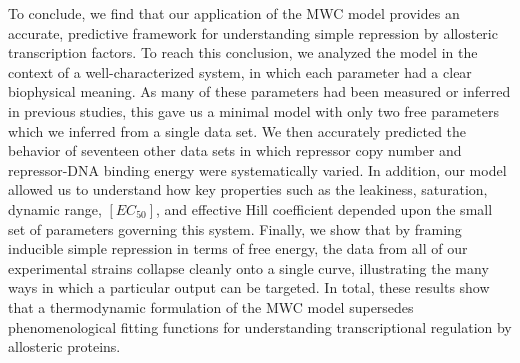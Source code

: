 To conclude, we find that our application of the MWC model provides an accurate,
predictive framework for understanding simple repression by allosteric
transcription factors. To reach this conclusion, we analyzed the model in the
context of a well-characterized system, in which each parameter had a clear
biophysical meaning. As many of these parameters had been measured or inferred
in previous studies, this gave us a minimal model with only two free parameters
which we inferred from a single data set. We then accurately predicted the
behavior of seventeen other data sets in which repressor copy number and
repressor-DNA binding energy were systematically varied. In addition, our model
allowed us to understand how key properties such as the leakiness, saturation,
dynamic range, $[EC_{50}]$, and effective Hill coefficient depended upon the
small set of parameters governing this system. Finally, we show that by framing
inducible simple repression in terms of free energy, the data from all of our
experimental strains collapse cleanly onto a single curve, illustrating the many
ways in which a particular output can be targeted. In total, these results show
that a thermodynamic formulation of the MWC model supersedes phenomenological
fitting functions for understanding transcriptional regulation by allosteric
proteins.
